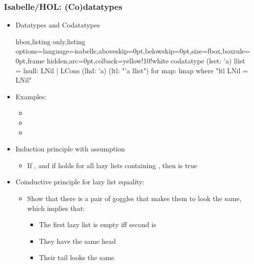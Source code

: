 \documentclass[aspectratio=169,10pt]{beamer}
\begin{document}
\begin{frame}[fragile]
  \frametitle{Isabelle/HOL: (Co)datatypes}
  \begin{itemize}
    \item Datatypes and Codatatypes
\vspace*{-1ex}
          \begin{tcblisting}{hbox,listing only,listing options={language=isabelle,aboveskip=0pt,belowskip=0pt},size=fbox,boxrule=0pt,frame hidden,arc=0pt,colback=yellow!10!white}
codatatype (lset: 'a) llist = lnull: LNil | LCons (lhd: 'a) (ltl: "'a llist")
  for map: lmap where "ltl LNil = LNil"
          \end{tcblisting}
\vspace*{-1ex}
    \item Examples:
          \begin{itemize}
            \item {}
            \item {}
            \item {}
          \end{itemize}
\vspace*{-1ex}
          \pause
    \item Induction principle with  assumption
          \begin{itemize}
            \item If , and if  holds for all lazy lists containing , then  is true
          \end{itemize}
          \pause
    \item Coinductive principle for lazy list equality:
          \begin{itemize}
            \item Show that there is a pair of goggles that makes them to look the same, which implies that:
                  \begin{itemize}
                    \item The first lazy list is empty iff second is
                    \item They have the same head
                    \item Their tail looks the same
                  \end{itemize}
          \end{itemize}
  \end{itemize}
\vspace*{-1ex}
\begin{overlayarea}{\textwidth}{.45\textheight}
  \begin{figure}
    \centering
  \end{figure}
\end{overlayarea}
\end{frame}
\end{document}
